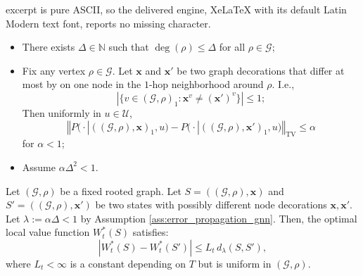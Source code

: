 \documentclass[10pt,a4paper]{amsart}
\begin{document}
excerpt is pure ASCII, so the delivered engine, XeLaTeX with its default Latin Modern text font, reports no missing character.
\begin{assumption} 
\label{ass:error_propagation_gnn}
    \leavevmode\par
    \begin{itemize}
        \item There exists $\Delta \in \mathbb N$ such that  $\deg (\rho) \le \Delta$ for all $\rho \in \mathcal G$;
        \item  Fix any vertex $\rho  \in \mathcal G$. Let $\mathbf x$ and $\mathbf x'$ be two graph decorations that differ at most by on one node in the $1$-hop neighborhood around $\rho$. I.e.,
        $$ |\{v \in (\mathcal G,\rho)_1  : \mathbf{x}^v \neq (\mathbf{x}')^v \}| \le 1;$$
        Then uniformly in $u \in \mathcal U$,
        $$\left\Vert P \big(\cdot | ( (\mathcal G,\rho), \mathbf{x})_1 ,u \big) - P \big(\cdot | ( (\mathcal G,\rho), \mathbf{x}')_1 ,u \big)  \right\Vert_{\mathrm{TV}} \le \alpha$$
        for $\alpha <1$;
        \item Assume $\alpha\Delta^2 < 1$.
    \end{itemize}
\end{assumption}

\begin{proposition}
\label{prop:value_stability}
Let $(\mathcal G, \rho)$ be a fixed rooted graph. Let $S = ((\mathcal G, \rho), \mathbf{x})$ and $S' = ((\mathcal G, \rho), \mathbf{x}')$ be two states with possibly different node decorations $\mathbf{x}, \mathbf{x}'$.
Let $\lambda := \alpha \Delta < 1$ by Assumption \ref{ass:error_propagation_gnn}. 
Then, the optimal local value function $W_t^*(S)$ satisfies:
\[
|W_t^*(S) - W_t^*(S')| \le L_t \, d_{\lambda}(S, S'),
\]
where $L_t < \infty$ is a constant depending on $T$ but is uniform in $(\mathcal G, \rho)$.
\end{proposition}
\end{document}

